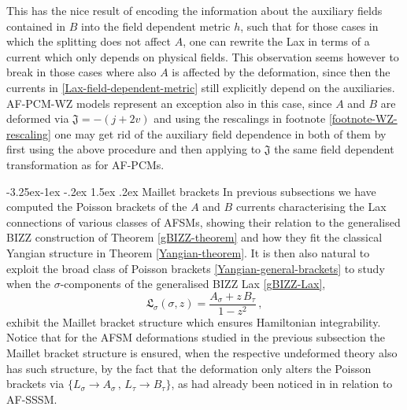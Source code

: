 \documentclass[12pt]{article}
\makeatletter
\renewcommand\subsection{\@startsection{subsection}{2}{\z@}%
                                     {-3.25ex\@plus -1ex \@minus -.2ex}%
                                     {1.5ex \@plus .2ex}%
                                     {\normalfont\bfseries}}
\numberwithin{equation}{section}
\makeatother
\begin{document}
This has the nice result of encoding the information about the auxiliary fields contained in $B$ into the field dependent metric $h$, such that for those cases in which the splitting does not affect $A$, one can rewrite the Lax in terms of a current which only depends on physical fields. This observation seems however to break in those cases where also $A$ is affected by the deformation, since then the currents in \eqref{Lax-field-dependent-metric} still explicitly depend on the auxiliaries. AF-PCM-WZ models represent an exception also in this case, since $A$ and $B$ are deformed via $\mathfrak{J}=-(j+2v)$ and using the rescalings in footnote \ref{footnote-WZ-rescaling} one may get rid of the auxiliary field dependence in both of them by first using the above procedure and then applying to $\mathfrak{J}$ the same field dependent transformation as for AF-PCMs.



\subsection{Maillet brackets}
In previous subsections we have computed the Poisson brackets of the $A$ and $B$ currents characterising the Lax connections of various classes of AFSMs, showing their relation to the generalised BIZZ construction of Theorem \ref{gBIZZ-theorem} and how they fit the classical Yangian structure in Theorem \ref{Yangian-theorem}. It is then also natural to exploit the broad class of Poisson brackets \eqref{Yangian-general-brackets} to study when the $\sigma$-components of the generalised BIZZ Lax \eqref{gBIZZ-Lax},
\begin{equation}\label{gBIZZ-Lax-tau-sigma-coordinates}
\mathfrak{L}_{\sigma}(\sigma,z)=\frac{A_{\sigma}+z \, B_{\tau}}{1-z^2} \, ,
\end{equation}
exhibit the Maillet bracket structure which ensures Hamiltonian integrability. Notice that for the AFSM deformations studied in the previous subsection the Maillet bracket structure is ensured, when the respective undeformed theory also has such structure, by the fact that the deformation only alters the Poisson brackets via $\{L_{\sigma}\rightarrow A_{\sigma} \, , \, L_{\tau}\rightarrow B_{\tau}\}$, as had already been noticed in \cite{Cesaro:2024ipq,Cesaro:2025msv} in relation to AF-SSSM. 
\end{document}
